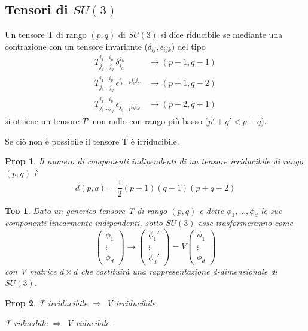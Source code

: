 \documentclass[10pt,a4paper]{article}
\newtheorem{thm}{Teo}[section]
\newtheorem{prop}{Prop}[section]
\theoremstyle{definition}
\begin{document}
\subsection{Tensori di $SU(3)$}
Un tensore T di rango $(p, q)$ di $SU(3)$ si dice riducibile se mediante una contrazione con un tensore invariante ($\delta_{ij}, \epsilon_{ijk}$) del tipo
\begin{align*}
T_{j_1 \dots j_q}^{i_1 \dots i_p} \, \delta_{i_a}^{j_b}  &\to (p - 1, q - 1) \\
T_{j_1 \dots j_q}^{i_1 \dots i_p}\,  \epsilon^{i_{p + 1} j_b j_{b'}} &\to (p + 1, q - 2) \\
T_{j_1 \dots j_q}^{i_1 \dots i_p} \, \epsilon_{j_{q + 1} i_b i_{b'}} &\to (p - 2, q + 1)
\end{align*}
si ottiene un tensore $T'$ non nullo con rango più basso ($p' + q' < p + q$).

Se ciò non è possibile il tensore T è irriducibile.

\begin{prop}
    Il numero di componenti indipendenti di un tensore irriducibile di rango $(p, q)$ è 
    \[
    d(p, q) = \frac12 (p+1)(q+1)(p+q+2)    
    \]
\end{prop}

\begin{thm}
    Dato un generico tensore T di rango $(p, q)$ e dette $\phi_1, \dots, \phi_d$ le sue componenti linearmente indipendenti, sotto $SU(3)$ esse trasformeranno come
    \[
    \begin{pmatrix}
        \phi_1 \\
        \vdots \\
        \phi_d 
    \end{pmatrix}    
    \to 
    \begin{pmatrix}
        \phi_1' \\
        \vdots \\
        \phi_d' 
    \end{pmatrix} 
    = V
    \begin{pmatrix}
        \phi_1 \\
        \vdots \\
        \phi_d 
    \end{pmatrix}
    \]
    con V matrice $d \times d$ che costituirà una rappresentazione d-dimensionale di $SU(3)$.
\end{thm}

\begin{prop}
    T irriducibile $\Rightarrow$ V irriducibile.

    T riducibile $\Rightarrow$ V riducibile.
\end{prop}
\end{document}
